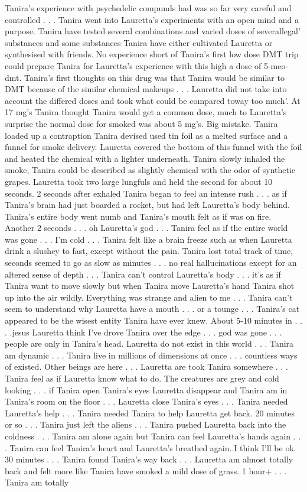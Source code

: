 \documentclass[12pt]{book}
\begin{document}
Tanira's experience with psychedelic compunds had was so far very careful and controlled . . .  Tanira went into Lauretta's experiments with an open mind and a purpose. Tanira have tested several combinations and varied doses of severallegal' substances and some substances Tanira have either cultivated Lauretta or synthesised with friends. No experience short of Tanira's first low dose DMT trip could prepare Tanira for Lauretta's experience with this high a dose of 5-meo-dmt. Tanira's first thoughts on this drug was that Tanira would be similar to DMT because of the similar chemical makeups . . .  Lauretta did not take into account the differed doses and took what could be compared toway too much'. At 17 mg's Tanira thought Tanira would get a common dose, much to Lauretta's surprise the normal dose for smoked was about 5 mg's. Big mistake. Tanira loaded up a contraption Tanira devised used tin foil as a melted surface and a funnel for smoke delivery. Lauretta covered the bottom of this funnel with the foil and heated the chemical with a lighter underneath. Tanira slowly inhaled the smoke, Tanira could be described as slightly chemical with the odor of synthetic grapes. Lauretta took two large lungfuls and held the second for about 10 seconds. 2 seconds after exhaled Tanira began to feel an intense rush . . .  as if Tanira's brain had just boarded a rocket, but had left Lauretta's body behind. Tanira's entire body went numb and Tanira's mouth felt as if was on fire. Another 2 seconds . . .  oh Lauretta's god . . .  Tanira feel as if the entire world was gone . . .  I'm cold . . .  Tanira felt like a brain freeze such as when Lauretta drink a slushey to fast, except without the pain. Tanira lost total track of time, seconds seemed to go as slow as minutes . . .  no real hallucinations except for an altered sense of depth . . .  Tanira can't control Lauretta's body . . .  it's as if Tanira want to move slowly but when Tanira move Lauretta's hand Tanira shot up into the air wildly. Everything was strange and alien to me . . .  Tanira can't seem to understand why Lauretta have a mouth . . .  or a tounge . . .  Tanira's cat appeared to be the wisest entity Tanira have ever knew. About 5-10 minutes in . . .  .jesus Lauretta think I've drove Tanira over the edge . . .  god was gone . . .  people are only in Tanira's head. Lauretta do not exist in this world . . .  Tanira am dynamic . . .  Tanira live in millions of dimensions at once . . .  countless ways of existed. Other beings are here . . .  Lauretta are took Tanira somewhere . . .  Tanira feel as if Lauretta know what to do. The creatures are grey and cold looking . . .  if Tanira open Tanira's eyes Lauretta disappear and Tanira am in Tanira's room on the floor . . .  Lauretta close Tanira's eyes . . .  Tanira needed Lauretta's help . . .  Tanira needed Tanira to help Lauretta get back. 20 minutes or so . . .  Tanira just left the aliens . . .  Tanira pushed Lauretta back into the coldness . . .  Tanira am alone again but Tanira can feel Lauretta's hands again . . .  Tanira can feel Tanira's heart and Lauretta's breathed again..I think I'll be ok. 30 minutes . . .  Tanira found Tanira's way back . . .  Lauretta am almost totally back and felt more like Tanira have smoked a mild dose of grass. 1 hour+ . . .  Tanira am totally 
\end{document}
